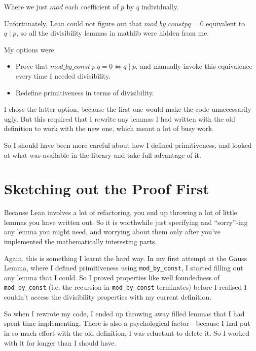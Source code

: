 \documentclass[pagesize=a4]{scrreprt}
\begin{document}
Where we just $mod$ each coefficient of $p$ by $q$ individually. 

Unfortunately, Lean could not figure out that $mod\_by\_const p q = 0$ equivalent to $q \mid p$, so all the divisibility lemmas in mathlib were hidden from me.

My options were 

\begin{itemize}
    \item Prove that $mod\_by\_const\ p\ q = 0 \iff q \mid p$, and manually invoke this equivalence every time I needed divisibility.
    \item Redefine primitiveness in terms of divisibility.
\end{itemize}

I chose the latter option, because the first one would make the code unnecessarily ugly. But this required that I rewrite any lemmas I had written with the old definition to work with the new one, which meant a lot of busy work. 

So I should have been more careful about how I defined primitiveness, and looked at what was available in the library and take full advantage of it. 

\section{Sketching out the Proof First}

Because Lean involves a lot of refactoring, you end up throwing a lot of little lemmas you have written out. So it is worthwhile just specifying and ``sorry''-ing any lemma you might need, and worrying about them only after you've implemented the mathematically interesting parts. 

Again, this is something I learnt the hard way. In my first attempt at the Gauss Lemma, where I defined primitiveness using \texttt{mod\_by\_const}, I started filling out any lemma that I could. So I proved properties like well foundedness of \texttt{mod\_by\_const} (i.e. the recursion in \texttt{mod\_by\_const} terminates) before I realised I couldn't access the divisibility properties with my current definition. 

So when I rewrote my code, I ended up throwing away filled lemmas that I had spent time implementing. There is also a psychological factor - because I had put in so much effort with the old definition, I was reluctant to delete it. So I worked with it for longer than I should have. 
\end{document}
